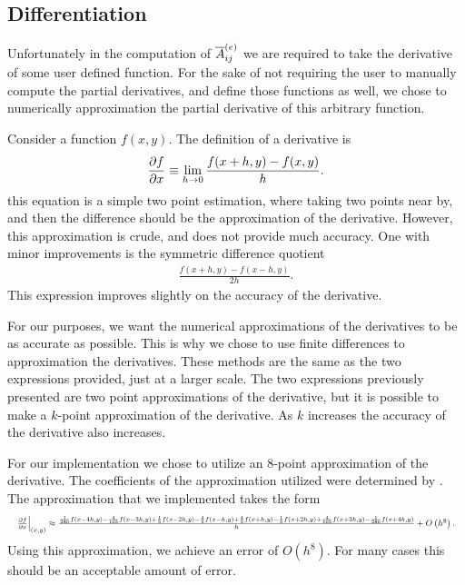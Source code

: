 \documentclass[../fem.tex]{subfile}
\begin{document}
\subsection{Differentiation}%
\label{sub:differentiation}

Unfortunately in the computation of $\overline{A}^{(e)}_{ij}$ we are required to take the
derivative of some user defined function. For the sake of not requiring the
user to manually compute the partial derivatives, and define those functions as
well, we chose to numerically approximation the partial derivative of this
arbitrary function.

Consider a function $f(x,y)$. The definition of a derivative is
\begin{align*}
  \frac{\partial f}{\partial x}\equiv\lim_{h\rightarrow 0}\frac{f(x+h,y)-f(x,y)}{h}.
\end{align*}
this equation is a simple two point estimation, where taking two points near
by, and then the difference should be the approximation of the derivative.
However, this approximation is crude, and does not provide much accuracy. One
with minor improvements is the symmetric difference quotient
\begin{align*}
  \frac{f(x+h,y)-f(x-h,y)}{2h}.
\end{align*}
This expression improves slightly on the accuracy of the derivative.

For our purposes, we want the numerical approximations of the derivatives to be
as accurate as possible. This is why we chose to use finite differences to
approximation the derivatives. These methods are the same as the two
expressions provided, just at a larger scale. The two expressions previously
presented are two point approximations of the derivative, but it is possible to
make a $k$-point approximation of the derivative. As $k$ increases the accuracy
of the derivative also increases.

For our implementation we chose to utilize an 8-point approximation of the
derivative. The coefficients of the approximation utilized were determined by
\cite{FD}. The approximation that we implemented takes the form
\begin{align*}
  \resizebox{\columnwidth}{!}{$
    \pder{f}{x}\Bigr|_{(x,y)}\approx\frac{\frac{1}{280}f(x-4h,y)-\frac{4}{105}f(x-3h,y)+\frac{1}{5}f(x-2h,y)-\frac{4}{5}f(x-h,y)+\frac{4}{5}f(x+h,y)-\frac{1}{5}f(x+2h,y)+\frac{4}{105}f(x+3h,y)-\frac{1}{280}f(x+4h,y)}{h}+O\left(h^8\right).
$}
\end{align*}
Using this approximation, we achieve an error of $O\left(h^8\right)$. For many
cases this should be an acceptable amount of error.
\end{document}
